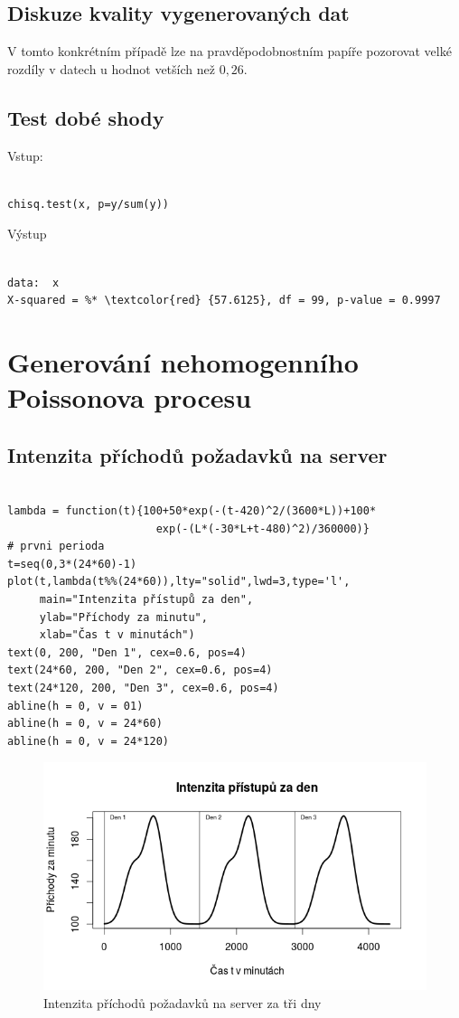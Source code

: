 \documentclass[12pt]{article}
\begin{document}
\subsection{Diskuze kvality vygenerovaných dat}
V tomto konkrétním případě lze na pravděpodobnostním papíře pozorovat velké rozdíly v datech u hodnot vetších než $0,26$.
\subsection{Test dobé shody}
Vstup:
 \begin{lstlisting}[frame=single]  % Start your code-block
  
chisq.test(x, p=y/sum(y)) 
\end{lstlisting}
Výstup
 \begin{lstlisting}[frame=single]  % Start your code-block
  
data:  x
X-squared = %* \textcolor{red} {57.6125}, df = 99, p-value = 0.9997
\end{lstlisting}

\section{Generování nehomogenního Poissonova procesu}
\subsection{Intenzita příchodů požadavků na server}
 \begin{lstlisting}[frame=single]  % Start your code-block
  
lambda = function(t){100+50*exp(-(t-420)^2/(3600*L))+100*
                       exp(-(L*(-30*L+t-480)^2)/360000)}
# prvni perioda
t=seq(0,3*(24*60)-1)
plot(t,lambda(t%%(24*60)),lty="solid",lwd=3,type='l',
     main="Intenzita přístupů za den",
     ylab="Příchody za minutu",
     xlab="Čas t v minutách")
text(0, 200, "Den 1", cex=0.6, pos=4)
text(24*60, 200, "Den 2", cex=0.6, pos=4)
text(24*120, 200, "Den 3", cex=0.6, pos=4)
abline(h = 0, v = 01)
abline(h = 0, v = 24*60)
abline(h = 0, v = 24*120)
\end{lstlisting}
\begin{figure}[ht!]
	\includegraphics[scale=0.5]{img/2_1_intenzita_prichodu}\centering
	\caption{Intenzita příchodů požadavků na server za tři dny}
	\label{obr:sikme}
\end{figure}
\end{document}
